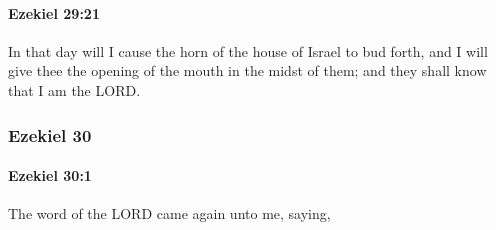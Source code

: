		\paragraph{Ezekiel 29:21} %
			\label{EZEKIEL-29-21}

			In that day will I cause the horn of the house of Israel to bud forth, and I will give thee the opening of the mouth in the midst of them; and they shall know that I am the LORD.

	\subsubsection{Ezekiel 30} %
		\label{EZEKIEL-30}

		\paragraph{Ezekiel 30:1} %
			\label{EZEKIEL-30-1}

			The word of the LORD came again unto me, saying,

